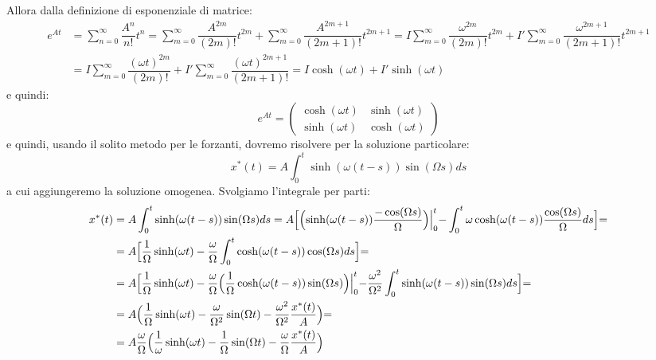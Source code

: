 \documentclass[a4paper,openany]{article}
\begin{document}
	Allora dalla definizione di esponenziale di matrice:
	\begin{equation}
		\begin{aligned}
			e^{At} &= \sum_{n=0}^{\infty} \dfrac{A^{n}}{n!}t^{n} = \sum_{m=0}^{\infty}\dfrac{A^{2m}}{(2m)!}t^{2m} + \sum_{m=0}^{\infty}\dfrac{A^{2m+1}}{(2m+1)!}t^{2m+1} =  I \sum_{m=0}^{\infty}\dfrac{\omega^{2m}}{(2m)!}t^{2m} + I' \sum_{m=0}^{\infty}\dfrac{\omega^{2m+1}}{(2m+1)!}t^{2m+1} \\
			&= I \sum_{m=0}^{\infty}\dfrac{(\omega t)^{2m}}{(2m)!} + I' \sum_{m=0}^{\infty}\dfrac{(\omega t)^{2m+1}}{(2m+1)!} = I \cosh(\omega t) + I'\sinh(\omega t)
		\end{aligned}
	\end{equation}
	e quindi:
	\begin{equation}\label{key}
		e^{At} = \begin{pmatrix}
			\cosh(\omega t) & \sinh(\omega t) \\
			\sinh(\omega t) & \cosh(\omega t)
		\end{pmatrix}
	\end{equation}
	e quindi, usando il solito metodo per le forzanti, dovremo risolvere per la soluzione particolare:
	\begin{equation}\label{key}
		x^{*}(t) = A \int_{0}^{t}\sinh(\omega (t-s))\sin(\Omega s) ds
	\end{equation}
	a cui aggiungeremo la soluzione omogenea. Svolgiamo l'integrale per parti:
	\begin{equation}\label{key}
		\begin{aligned}
			x^{*}(t) &= A \int_{0}^{t}\sinh(\omega (t-s))\sin(\Omega s) ds = A\Bigl[\Bigl(\sinh(\omega(t-s)) \dfrac{-\cos(\Omega s)}{\Omega}\Bigl)\Bigl|_{0}^{t} - \int_{0}^{t}\omega\cosh(\omega(t-s)) \dfrac{\cos(\Omega s)}{\Omega}ds\Bigl] =
			\\ 
			&= A\Bigl[\dfrac{1}{\Omega}\sinh(\omega t)- \dfrac{\omega}{\Omega}\int_{0}^{t}\cosh(\omega(t-s))\cos(\Omega s)ds\Bigl] = 
			\\
			&= A \Bigl[\dfrac{1}{\Omega}\sinh(\omega t) - \dfrac{\omega}{\Omega}\Bigl(\dfrac{1}{\Omega}\cosh(\omega(t-s))\sin(\Omega s)\Bigl)\Bigl|_{0}^{t}-\dfrac{\omega^2}{\Omega^2}\int_{0}^{t}\sinh(\omega(t-s))\sin(\Omega s)ds\Bigl] =\\
			&= A\Bigl(\dfrac{1}{\Omega}\sinh(\omega t)
			- \dfrac{\omega}{\Omega^2}\sin(\Omega t) - \dfrac{\omega^2}{\Omega^2}\dfrac{x^{*}(t)}{A}\Bigl) = \\
			&= A \dfrac{\omega}{\Omega}\Bigl(\dfrac{1}{\omega}\sinh(\omega t)-\dfrac{1}{\Omega}\sin(\Omega t)- \dfrac{\omega}{\Omega}\dfrac{x^{*}(t)}{A}  \Bigl) 
		\end{aligned}
	\end{equation}
\end{document}
